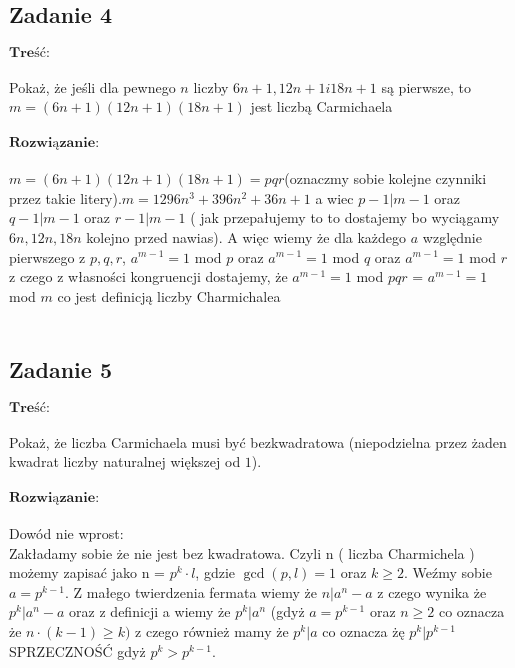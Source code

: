 \subsection{Zadanie 4}
$\textbf{Treść:}$  \\ \\
Pokaż, że jeśli dla pewnego $n$ liczby $6n + 1, 12n + 1 i 18n + 1$ są pierwsze,
to $m = (6n + 1)(12n + 1)(18n + 1)$ jest liczbą Carmichaela
\\
\\
$\textbf{Rozwiązanie:}$ \\
\\
$m = (6n + 1)(12n + 1)(18n + 1) = pqr $(oznaczmy sobie kolejne czynniki przez takie litery).$m = 1296 n^3 + 396 n^2 + 36 n + 1$ a wiec $p-1 | m-1$ oraz $q-1 | m-1$ oraz $r-1 | m-1$ ( jak przepałujemy to to dostajemy bo wyciągamy $6n,12n,18n$ kolejno przed nawias). A więc wiemy że dla każdego $a$ względnie pierwszego z $p,q,r$, $a^{m-1} = 1$ mod $p$ oraz $a^{m-1} = 1$ mod $q$ oraz $a^{m-1} = 1$ mod $r$ z czego z własności kongruencji dostajemy, że $a^{m-1} = 1$ mod $pqr$ = $a^{m-1} = 1$ mod $m$ co jest definicją liczby Charmichalea
\\ \\


\subsection{Zadanie 5}
$\textbf{Treść:}$ \\ \\
Pokaż, że liczba Carmichaela musi być bezkwadratowa (niepodzielna przez
żaden kwadrat liczby naturalnej większej od $1$). \\ \\
$\textbf{Rozwiązanie:}$ \\
\\
Dowód nie wprost: \\
Zakładamy sobie że nie jest bez kwadratowa. Czyli n ( liczba Charmichela ) możemy zapisać jako n = $p^k \cdot l$, gdzie $\gcd(p,l) = 1$ oraz $k \ge 2$. Weźmy sobie $a = p^{k-1}$. Z małego twierdzenia fermata wiemy że $n | a^n - a$ z czego wynika że $p^k | a^n - a$ oraz z definicji a wiemy że $p^k | a^n$ (gdyż $a = p^{k-1}$ oraz $n \ge 2$ co oznacza że $n\cdot (k-1) \ge k )$ z czego również mamy że $p^k | a$ co oznacza żę $p^k | p^{k-1}$ SPRZECZNOŚĆ gdyż $p^k > p^{k-1}$.
